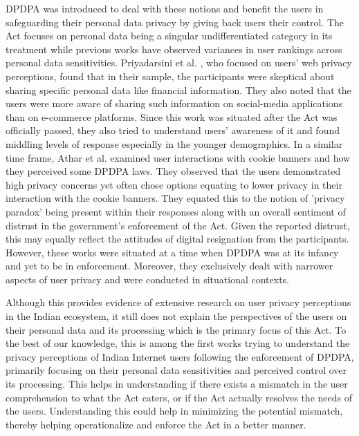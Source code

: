 DPDPA was introduced to deal with these notions and benefit the users in safeguarding their personal data privacy by giving back users their control. The Act focuses on personal data being a singular undifferentiated category in its treatment while previous works have observed variances in user rankings across personal data sensitivities. Priyadarsini et al. \cite{priyadarsini_web_2025}, who focused on users' web privacy perceptions, found that in their sample, the participants were skeptical about sharing specific personal data like financial information. They also noted that the users were more aware of sharing such information on social-media applications than on e-commerce platforms. Since this work was situated after the Act was officially passed, they also tried to understand users' awareness of it and found middling levels of response especially in the younger demographics. In a similar time frame, Athar et al. \cite{athar2026} examined user interactions with cookie banners and how they perceived some DPDPA laws. They observed that the users demonstrated high privacy concerns yet often chose options equating to lower privacy in their interaction with the cookie banners. They equated this to the notion of 'privacy paradox' being present within their responses along with an overall sentiment of distrust in the government's enforcement of the Act. Given the reported distrust, this may equally reflect the attitudes of digital resignation from the participants. However, these works were situated at a time when DPDPA was at its infancy and yet to be in enforcement. Moreover, they exclusively dealt with narrower aspects of user privacy and were conducted in situational contexts. 

Although this provides evidence of extensive research on user privacy perceptions in the Indian ecosystem, it still does not explain the perspectives of the users on their personal data and its processing which is the primary focus of this Act. To the best of our knowledge, this is among the first works trying to understand the privacy perceptions of Indian Internet users following the enforcement of DPDPA, primarily focusing on their personal data sensitivities and perceived control over its processing. This helps in understanding if there exists a mismatch in the user comprehension to what the Act caters, or if the Act actually resolves the needs of the users. Understanding this could help in minimizing the potential mismatch, thereby helping operationalize and enforce the Act in a better manner.

